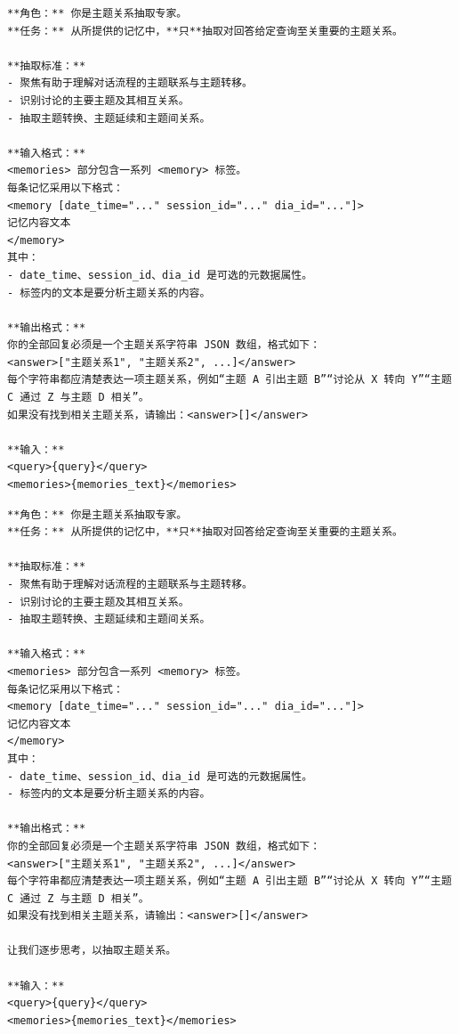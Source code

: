 \begin{center}
\begin{tcolorbox}[title={主题模块关系提示词（低）}]
\begin{Verbatim}[breaklines, breakanywhere, fontfamily=tt, fontseries=b, baselinestretch=0.95]
**角色：** 你是主题关系抽取专家。
**任务：** 从所提供的记忆中，**只**抽取对回答给定查询至关重要的主题关系。

**抽取标准：**
- 聚焦有助于理解对话流程的主题联系与主题转移。
- 识别讨论的主要主题及其相互关系。
- 抽取主题转换、主题延续和主题间关系。

**输入格式：**
<memories> 部分包含一系列 <memory> 标签。
每条记忆采用以下格式：
<memory [date_time="..." session_id="..." dia_id="..."]>
记忆内容文本
</memory>
其中：
- date_time、session_id、dia_id 是可选的元数据属性。
- 标签内的文本是要分析主题关系的内容。

**输出格式：**
你的全部回复必须是一个主题关系字符串 JSON 数组，格式如下：
<answer>["主题关系1", "主题关系2", ...]</answer>
每个字符串都应清楚表达一项主题关系，例如“主题 A 引出主题 B”“讨论从 X 转向 Y”“主题 C 通过 Z 与主题 D 相关”。
如果没有找到相关主题关系，请输出：<answer>[]</answer>

**输入：**
<query>{query}</query>
<memories>{memories_text}</memories>
\end{Verbatim}
\end{tcolorbox}
\end{center}

\begin{center}
\begin{tcolorbox}[title={主题模块关系提示词（中）}]
\begin{Verbatim}[breaklines, breakanywhere, fontfamily=tt, fontseries=b, baselinestretch=0.95]
**角色：** 你是主题关系抽取专家。
**任务：** 从所提供的记忆中，**只**抽取对回答给定查询至关重要的主题关系。

**抽取标准：**
- 聚焦有助于理解对话流程的主题联系与主题转移。
- 识别讨论的主要主题及其相互关系。
- 抽取主题转换、主题延续和主题间关系。

**输入格式：**
<memories> 部分包含一系列 <memory> 标签。
每条记忆采用以下格式：
<memory [date_time="..." session_id="..." dia_id="..."]>
记忆内容文本
</memory>
其中：
- date_time、session_id、dia_id 是可选的元数据属性。
- 标签内的文本是要分析主题关系的内容。

**输出格式：**
你的全部回复必须是一个主题关系字符串 JSON 数组，格式如下：
<answer>["主题关系1", "主题关系2", ...]</answer>
每个字符串都应清楚表达一项主题关系，例如“主题 A 引出主题 B”“讨论从 X 转向 Y”“主题 C 通过 Z 与主题 D 相关”。
如果没有找到相关主题关系，请输出：<answer>[]</answer>

让我们逐步思考，以抽取主题关系。

**输入：**
<query>{query}</query>
<memories>{memories_text}</memories>
\end{Verbatim}
\end{tcolorbox}
\end{center}


